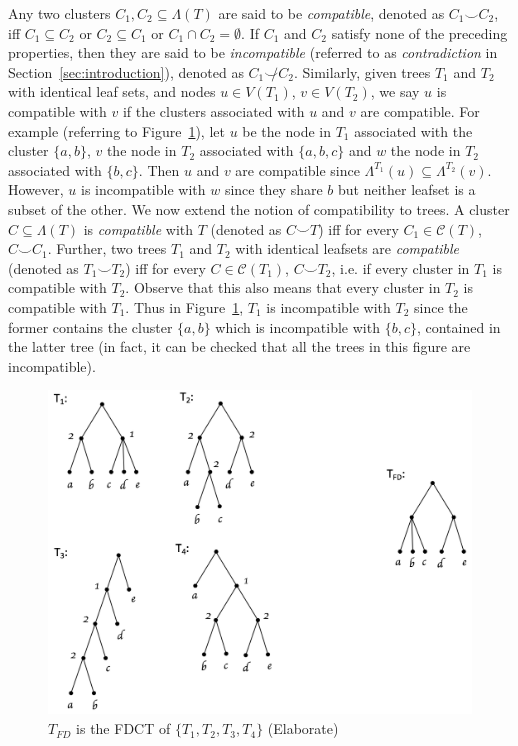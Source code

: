 \documentclass{article}
\newcommand{\compatible}{\smile}
\newcommand{\leafset}{\Lambda}
\begin{document}
    Any two clusters $C_1, C_2 \subseteq \leafset(T)$ are said to be \textit{compatible}, denoted as $C_1 \compatible C_2$, iff $C_1 \subseteq C_2$ or $C_2 \subseteq C_1$ or $C_1 \cap C_2 = \emptyset$. If $C_1$ and $C_2$ satisfy none of the preceding properties, then they are said to be \textit{incompatible} (referred to as \textit{contradiction} in Section~\ref{sec:introduction}), denoted as $C_1 \not\compatible C_2$. Similarly, given trees $T_1$ and $T_2$ with identical leaf sets, and nodes $u \in V(T_1)$, $v \in V(T_2)$, we say $u$ is compatible with $v$ if the clusters associated with $u$ and $v$ are compatible. For example (referring to Figure~\ref{fig:freqdiff}), let $u$ be the node in $T_1$ associated with the cluster $\{a, b\}$, $v$ the node in $T_2$ associated with $\{a, b, c\}$ and $w$ the node in $T_2$ associated with $\{b, c\}$. Then $u$ and $v$ are compatible since $\leafset^{T_1}(u) \subseteq \leafset^{T_2}(v)$. However, $u$ is incompatible with $w$ since they share $b$ but neither leafset is a subset of the other. We now extend the notion of compatibility to trees. A cluster $C \subseteq \leafset(T)$ is \textit{compatible} with $T$ (denoted as $C \compatible T$) iff for every $C_1 \in \mathcal{C}(T)$, $C \compatible C_1$. Further, two trees $T_1$ and $T_2$ with identical leafsets are \textit{compatible} (denoted as $T_1 \compatible T_2$) iff for every $C \in \mathcal{C}(T_1)$, $C \compatible T_2$, i.e. if every cluster in $T_1$ is compatible with $T_2$. Observe that this also means that every cluster in $T_2$ is compatible with $T_1$. Thus in Figure~\ref{fig:freqdiff}, $T_1$ is incompatible with $T_2$ since the former contains the cluster $\{a, b\}$ which is incompatible with $\{b, c\}$, contained in the latter tree (in fact, it can be checked that all the trees in this figure are incompatible).

    \begin{figure}[h]
        \includegraphics[scale=0.5]{freqdiff}
        \centering
        \caption{$T_{FD}$ is the FDCT of $\{T_1, T_2, T_3, T_4\}$ {\color{red}(Elaborate)}}
        \label{fig:freqdiff}
    \end{figure}
\end{document}
